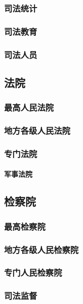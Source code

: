 \documentclass[UTF8]{../ApplicationUniverse}
\begin{document}
        \subsubsection{司法统计}
        \subsubsection{司法教育}
        \subsubsection{司法人员}
    \subsection{法院}
        \subsubsection{最高人民法院}
        \subsubsection{地方各级人民法院}
        \subsubsection{专门法院}
            \paragraph{军事法院}

    \subsection{检察院}
        \subsubsection{最高检察院}
        \subsubsection{地方各级人民检察院}
        \subsubsection{专门人民检察院}
        \subsubsection{司法监督}
\end{document}
